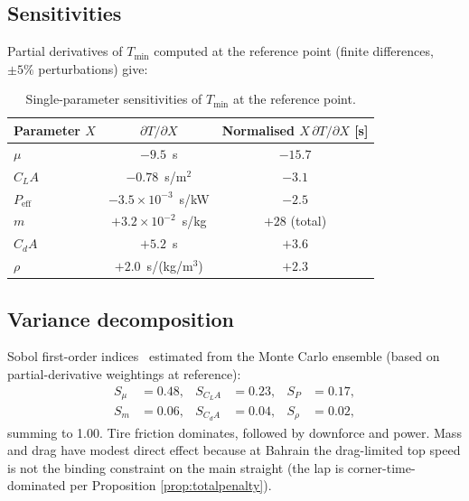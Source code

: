 \documentclass[11pt,twocolumn]{article}
\theoremstyle{definition}
\theoremstyle{remark}
\begin{document}
\subsection{Sensitivities}

Partial derivatives of $T_{\min}$ computed at the reference point (finite
differences, $\pm 5\%$ perturbations) give:

\begin{table}[!t]
\centering
\caption{Single-parameter sensitivities of $T_{\min}$ at the reference point.}
\label{tab:sens}
\begin{tabular}{lcc}
\toprule
Parameter $X$ & $\partial T/\partial X$ & Normalised $X\, \partial T/\partial X$ [s] \\
\midrule
$\mu$            & $-9.5$~s                & $-15.7$ \\
$C_L A$          & $-0.78$~s/m$^2$          & $-3.1$ \\
$P_{\mathrm{eff}}$ & $-3.5\times 10^{-3}$~s/kW & $-2.5$ \\
$m$              & $+3.2\times 10^{-2}$~s/kg & $+28$ (total) \\
$C_d A$          & $+5.2$~s               & $+3.6$ \\
$\rho$           & $+2.0$~s/(kg/m$^3$)    & $+2.3$ \\
\bottomrule
\end{tabular}
\end{table}

\subsection{Variance decomposition}

Sobol first-order indices~\cite{sobol2001,saltelli2008} estimated from the
Monte Carlo ensemble (based on partial-derivative weightings at reference):
\begin{align*}
  S_\mu &= 0.48, & S_{C_LA} &= 0.23, & S_{P} &= 0.17,\\
  S_m &= 0.06, & S_{C_dA} &= 0.04, & S_\rho &= 0.02,
\end{align*}
summing to 1.00. Tire friction dominates, followed by downforce and power.
Mass and drag have modest direct effect because at Bahrain the drag-limited
top speed is not the binding constraint on the main straight (the lap is
corner-time-dominated per Proposition \ref{prop:totalpenalty}).
\end{document}
